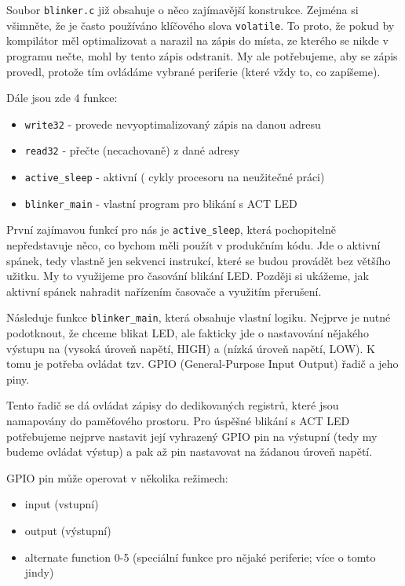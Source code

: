 \documentclass{article}
\begin{document}
Soubor \texttt{blinker.c} již obsahuje o něco zajímavější konstrukce. Zejména si všimněte, že je často používáno klíčového slova \texttt{volatile}. To proto, že pokud by kompilátor měl optimalizovat a narazil na zápis do místa, ze kterého se nikde v programu nečte, mohl by tento zápis odstranit. My ale potřebujeme, aby se zápis provedl, protože tím ovládáme vybrané periferie (které  vždy to, co zapíšeme).

Dále jsou zde 4 funkce:
\begin{itemize}
	\item \texttt{write32} - provede nevyoptimalizovaný zápis na danou adresu
	\item \texttt{read32} - přečte (necachovaně) z dané adresy
	\item \texttt{active\_sleep} - aktivní  ( cykly procesoru na neužitečné práci)
	\item \texttt{blinker\_main} - vlastní program pro blikání s ACT LED
\end{itemize}

První zajímavou funkcí pro nás je \texttt{active\_sleep}, která pochopitelně nepředstavuje něco, co bychom měli použít v produkčním kódu. Jde o aktivní spánek, tedy vlastně jen sekvenci instrukcí, které se budou provádět bez většího užitku. My to využijeme pro časování blikání LED. Později si ukážeme, jak aktivní spánek nahradit nařízením časovače a využitím přerušení.

Následuje funkce \texttt{blinker\_main}, která obsahuje vlastní logiku. Nejprve je nutné podotknout, že chceme blikat LED, ale fakticky jde o nastavování nějakého výstupu na  (vysoká úroveň napětí, HIGH) a  (nízká úroveň napětí, LOW). K tomu je potřeba ovládat tzv. GPIO (General-Purpose Input Output) řadič a jeho piny.

Tento řadič se dá ovládat zápisy do dedikovaných registrů, které jsou namapovány do paměťového prostoru. Pro úspěšné blikání s ACT LED potřebujeme nejprve nastavit její vyhrazený GPIO pin na výstupní (tedy my budeme ovládat výstup) a pak až pin nastavovat na žádanou úroveň napětí.

GPIO pin může operovat v několika režimech:
\begin{itemize}
	\item input (vstupní)
	\item output (výstupní)
	\item alternate function 0-5 (speciální funkce pro nějaké periferie; více o tomto jindy)
\end{itemize}
\end{document}
